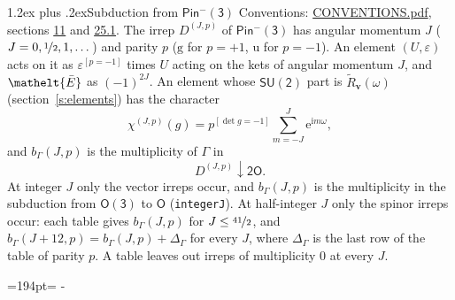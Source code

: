 \documentclass[10pt,a4paper]{article}
\makeatletter
\renewcommand\section{\@startsection{section}{1}{\z@}{-3ex plus -1ex minus -.2ex}%
  {1.2ex plus .2ex}{\normalfont\large\sffamily\bfseries\color{parttitle}}}
\newcommand{\needspace}[1]{\par\penalty-100\begingroup\dimen0=#1\relax\dimen2=\pagegoal
  \advance\dimen2-\pagetotal\ifdim\dimen0>\dimen2\relax\ifdim\dimen2>0pt\vfil\break\fi\fi
  \endgroup}
\numberwithin{equation}{section}
\newcommand{\eltfont}[1]{{\let\sigma\eltsigma\mathelt{#1}}}
\newcommand{\grp}[1]{\mathsf{#1}}
\newcommand{\elt}[1]{\eltfont{#1}}
\newcommand{\ptag}[1]{\mathrm{#1}}
\newcommand{\iverson}[1]{[#1]}
\newcommand{\restr}[2]{#1\!\downarrow#2}
\newcommand{\vv}{\mathbf{v}}
\newcommand{\iunit}{\mathrm{i}}
\newcommand{\expe}{\mathrm{e}}
\newcommand{\irrJp}[2]{D^{(#1,#2)}}
\newcommand{\barred}[1]{\bar{#1}}
\newcommand{\lift}[1]{\tilde{#1}}
\makeatother
\begin{document}
\section{Subduction from \texorpdfstring{$\grp{Pin^{-}(3)}$}{Pin(3)}}\label{s:subduction_parent}
Conventions: \href{../../CONVENTIONS.pdf}{CONVENTIONS.pdf}, sections \href{../../../rotation/CONVENTIONS.pdf\#conv.11}{11} and \href{../../CONVENTIONS.pdf\#conv.25.1}{25.1}.
\leavevmode\label{n:index.J}\label{n:index.parity}\label{n:irrep.o3}The irrep $\irrJp{J}{p}$ of \href{Pinminus3.pdf}{$\grp{Pin^{-}(3)}$} has angular momentum $J$ ($J = 0, \nicefrac{1}{2}, 1, \dots$) and parity $p$ ($\ptag{g}$ for $p = +1$, $\ptag{u}$ for $p = -1$). An element $(U, \varepsilon)$ acts on it as $\varepsilon^{[p = -1]}$ times $U$ acting on the kets of angular momentum $J$, and $\elt{\barred{E}}$ as $(-1)^{2J}$. \label{n:function.character.parent}\label{n:function.multiplicity}An element whose $\grp{SU(2)}$ part is $\lift{R}_{\vv}(\omega)$ (section~\ref{s:elements}) has the character
\begin{equation}\label{e:chi}\chi^{(J,p)}(g) = p^{\iverson{\det g = -1}}\sum_{m=-J}^{J} \expe^{\iunit m\omega},\end{equation}
and $b_\Gamma(J, p)$ is the multiplicity of $\Gamma$ in
\begin{equation}\label{e:parent}\restr{\irrJp{J}{p}}{\grp{2O}}.\end{equation}
At integer $J$ only the vector irreps occur, and $b_\Gamma(J, p)$ is the multiplicity in the subduction from $\grp{O(3)}$ to \href{../../../rotation/data/pdf/O.pdf}{$\grp{O}$} (\texttt{integerJ}). \label{n:index.increment}At half-integer $J$ only the spinor irreps occur: each table gives $b_\Gamma(J, p)$ for $J \le \nicefrac{41}{2}$, and $b_\Gamma(J + 12, p) = b_\Gamma(J, p) + \Delta_\Gamma$ for every $J$, where $\Delta_\Gamma$ is the last row of the table of parity $p$. A table leaves out irreps of multiplicity 0 at every $J$.
\needspace{194pt}
\end{document}
